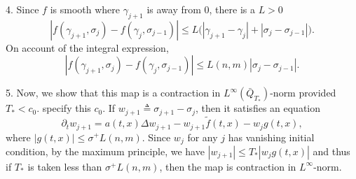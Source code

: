 \documentclass[a4paper,11pt]{article}
\def\blue{\color{blue}}
\theoremstyle{remark}
\begin{document}
 4. Since $f$ is smooth where $\gamma_{j+1}$ is away from $0$, there is a $L>0$
 $$ |f(\gamma_{j+1},\sigma_j)- f(\gamma_{j},\sigma_{j-1})| \le L\Big(|\gamma_{j+1}-\gamma_{j}| + |\sigma_{j}-\sigma_{j-1}|\Big).$$
 On account of the integral expression,
 $$ |f(\gamma_{j+1},\sigma_j)- f(\gamma_{j},\sigma_{j-1})| \le L(n,m)|\sigma_{j}-\sigma_{j-1}|.$$
 
 5. Now, we show that this map is a contraction in $L^\infty(\bar{Q}_{T_*})$-norm provided $T_* < c_0$. {\blue specify this $c_0$.} If $w_{j+1}\triangleq \sigma_{j+1}-\sigma_{j}$, then it satisfies an equation
 $$ \partial_t w_{j+1} = a(t,x)\Delta w_{j+1} - w_{j+1}\tilde{f}(t,x) - w_{j}g(t,x),$$
 where $|g(t,x)| \le \sigma^+ L(n,m)$.
 Since $w_j$ for any $j$ has vanishing initial condition, by the maximum principle, we have
 $|w_{j+1}| \le T_*|w_j g(t,x)|$ and thus if $T_*$ is taken less than $\sigma^+ L(n,m)$, then the map is contraction in $L^\infty$-norm.
 


% 


\end{document}
